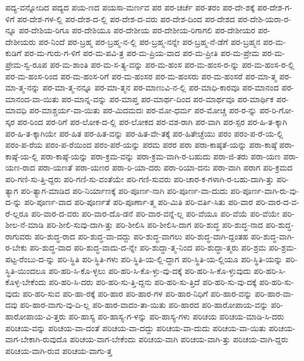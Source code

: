 {ಪದ್ಯ-ವನ್ನೋದಿದ
ಪದ್ಯದ
ಪಯ-ಣದ
ಪಯಸಾ-ಮರ್ಣವ
ಪರ
ಪರ-ಚರ್ಚೆ
ಪರ-ತರಂ
ಪರ-ದೇ-ಶಕ್ಕೆ
ಪರ-ದೇಶ-ಗ-ಳಿಗೆ
ಪರ-ದೇಶ-ಗಳ-ಲ್ಲಿ
ಪರ-ದೇಶ-ದ-ಲ್ಲಿ
ಪರ-ದೇಶ-ದ-ವರು
ಪರ-ದೇಶ-ದಿಂದ
ಪರ-ದೇಶದ
ಪರ-ದೇಶಿ-ಯರಾ-ರ-ನ್ನೂ
ಪರ-ದೇಶಿಯ-ರಿಗೂ
ಪರ-ದೇಶಿಯೂ
ಪರ-ದೇಶೀಯ
ಪರ-ದೇಶೀಯ-ರಿಗಾಗಲಿ
ಪರ-ದೇಶೀಯರ
ಪರ-ದೇಶೀಯರು
ಪರ-ನಿಂದೆ
ಪರ-ಬ್ರಹ್ಮ
ಪರ-ಬ್ರಹ್ಮ-ನ-ಲ್ಲಿ
ಪರ-ಬ್ರಹ್ಮ-ನನ್ನೇ
ಪರ-ಬ್ರಹ್ಮ-ನೆ-ಡೆಗೆ
ಪರ-ಬ್ರಹ್ಮನ
ಪರ-ಮ-ಕುಡಿಗೆ
ಪರ-ಮ-ಗುರು-ಗ-ಳಿಗೆ
ಪರ-ಮ-ಪವಿ-ತ್ರ
ಪರ-ಮ-ಪ್ರಿಯ-ವಾದ
ಪರ-ಮ-ಪ್ರೀತಿ
ಪರ-ಮ-ಪ್ರೇಮ
ಪರ-ಮ-ಪ್ರೇಮ-ಸ್ವ-ರೂಪ
ಪರ-ಮ-ಶಾಂತಿ
ಪರ-ಮ-ಸ-ತ್ಯ-ವನ್ನು
ಪರ-ಮ-ಹಂಸ
ಪರ-ಮ-ಹಂಸ-ರ-ನ್ನು
ಪರ-ಮ-ಹಂಸ-ರ-ಲ್ಲಿ
ಪರ-ಮ-ಹಂಸ-ರಿಂದ
ಪರ-ಮ-ಹಂಸ-ರಿಗೆ
ಪರ-ಮ-ಹಂಸರ
ಪರ-ಮ-ಹಂಸರು
ಪರ-ಮ-ಹಂಸರೆ
ಪರ-ಮಾ-ತ್ಮ
ಪರ-ಮಾ-ತ್ಮ-ನನ್ನು
ಪರ-ಮಾ-ತ್ಮ-ನನ್ನೂ
ಪರ-ಮಾ-ತ್ಮನ
ಪರ-ಮಾಣುವಿ-ನ-ಲ್ಲಿ
ಪರ-ಮಾಧಿ-ಕಾರವೂ
ಪರ-ಮಾನಂದ
ಪರ-ಮಾನಂದ-ವಾ-ಯಿತು
ಪರ-ಮಾನ್ನ-ವನ್ನು
ಪರ-ಮಾಪ್ತ
ಪರ-ಮಾರ್ಥ-ದಿಂದ
ಪರ-ಮಾರ್ಥವೂ
ಪರ-ಮಾರ್ಥಿಕ
ಪರ-ಮಾವಧಿ
ಪರ-ಮಾಶ್ಚರ್ಯ-ವಾ-ಯಿತು
ಪರ-ಮಿದಮದಃ
ಪರ-ಮೋ-ಧರ್ಮ
ಪರ-ಮೋಚ್ಚ
ಪರ-ರ-ನ್ನು
ಪರ-ರಿ-ಗೋ-ಸ್ಕರ
ಪರ-ರಿಂದ
ಪರ-ರಿಗೆ
ಪರ-ಲೋಕ-ದ-ಲ್ಲಿ
ಪರ-ಲೋಕದ
ಪರ-ವಶ-ರಾಗಿ
ಪರ-ವಾಗಿ
ಪರ-ಸ್ಪರ
ಪರ-ಹಿ-ತ-ಕ್ಕಾಗಿ
ಪರ-ಹಿ-ತ-ಕ್ಕಾಗಿಯೇ
ಪರ-ಹಿತ
ಪರ-ಹಿತ-ವನ್ನು
ಪರ-ಹಿತ-ವೇ-ತಕ್ಕೆ
ಪರ-ಹಿತೇಚ್ಛೆಯು
ಪರಂ
ಪರಂ-ಪ-ರೆ-ಯ-ಲ್ಲಿ
ಪರಂ-ಪ-ರೆಯ
ಪರಂ-ಪ-ರೆಯಿಂದ
ಪರಂ-ಪರೆ-ಯನ್ನು
ಪರಮ
ಪರರ
ಪರಾ
ಪರಾ-ಕಾಷ್ಠತೆ-ಯನ್ನು
ಪರಾ-ಕಾಷ್ಠೆ
ಪರಾ-ಕಾಷ್ಠೆ-ಯ-ಲ್ಲಿ
ಪರಾ-ಕಾಷ್ಠೆ-ಯನ್ನು
ಪರಾ-ಕ್ರಮ-ವನ್ನು
ಪರಾ-ಕ್ರಮ-ವಾಗಿ-ರ-ಬಹುದು
ಪರಾ-ಜಿ-ತರು
ಪರಾ-ಯಣ
ಪರಾ-ಯಣ-ರಾದ
ಪರಾ-ಯಣತೆ
ಪರಾ-ಯಣರ
ಪರಾ-ರಿ-ಯಾ-ದರು
ಪರಾ-ರಿಯಾ-ದನು
ಪರಾ-ವಾಗಿ
ಪರಾಗ
ಪರಿ-ಕ್ರಮದ
ಪರಿ-ಗಣಿ-ಸು-ತ್ತಿ-ದ್ದರು
ಪರಿ-ಗಣಿ-ಸು-ವಂತೆಯೇ
ಪರಿ-ಗಣಿ-ಸುವರು
ಪರಿ-ಚಾರ-ಕ-ಗಳಾಗಿ-ರ-ಬಹು-ದಾಗಿ-ತ್ತು
ಪರಿ-ತ್ಯಾಗ
ಪರಿ-ತ್ಯಾಗ-ಮಾಡಿದ
ಪರಿ-ನಿರ್ಯಾಣಕ್ಕೆ
ಪರಿ-ಪೂರ್ಣ-ನಾಗಿ
ಪರಿ-ಪೂರ್ಣ-ವಾ-ದುದು
ಪರಿ-ಪೂರ್ಣ-ವಾಗಿ-ರು-ವು-ದ-ನ್ನು
ಪರಿ-ಪೂರ್ಣ-ವಾದ
ಪರಿ-ಪೂರ್ಣತೆ
ಪರಿ-ಪೂರ್ಣಾ-ತ್ಮ
ಪರಿ-ಮಿತಿ
ಪರಿ-ವರ್ತಿ-ಸಿತು
ಪರಿ-ವಾರ
ಪರಿ-ವಾರ-ದ-ವ-ರೆ-ಲ್ಲರೂ
ಪರಿ-ವಾರ-ದ-ವರು
ಪರಿ-ವಾರ-ದೊ-ಡನೆ
ಪರಿ-ವಾರ-ವನ್ನೆ-ಲ್ಲ
ಪರಿ-ವೆಯೂ
ಪರಿ-ವೆಯೆ
ಪರಿ-ವೆಯೇ
ಪರಿ-ಶೀಲ-ನೆ-ಮಾಡಿ
ಪರಿ-ಶೀಲಿ-ಸುವು-ದಾಗಿ-ತ್ತು
ಪರಿ-ಶೀಲಿಸಿ
ಪರಿ-ಶೀಲಿಸಿ-ದಾಗ
ಪರಿ-ಶುದ್ಧ
ಪರಿ-ಶುದ್ಧ-ನಾದ
ಪರಿ-ಶುದ್ಧ-ರಾಗುವರು
ಪರಿ-ಶುದ್ಧ-ರಾದ
ಪರಿ-ಶುದ್ಧ-ವಾ-ದದ್ದು
ಪರಿ-ಶುದ್ಧ-ವಾಗಲು
ಪರಿ-ಶುದ್ಧ-ವಾಗಿ-ದ್ದಂತಹ
ಪರಿ-ಶುದ್ಧ-ವಾಗಿ-ರ-ಬೇಕು
ಪರಿ-ಶುದ್ಧ-ವಾದ
ಪರಿ-ಶುದ್ಧ-ವಾದು-ದ-ನ್ನೇ
ಪರಿ-ಶುದ್ಧಾ-ತ್ಮ-ನಿಂದ
ಪರಿ-ಶುದ್ಧಾ-ತ್ಮರು
ಪರಿ-ಶ್ರಮ
ಪರಿ-ಶ್ರಮ-ಪಟ್ಟ-ರೆಂಬು-ದ-ನ್ನು
ಪರಿ-ಸ್ಥಿತಿ
ಪರಿ-ಸ್ಥಿತಿ-ಗಳು
ಪರಿ-ಸ್ಥಿತಿ-ಯ-ಲ್ಲಿ-ದ್ದಾಗ
ಪರಿ-ಸ್ಥಿತಿ-ಯ-ಲ್ಲಿಯೂ
ಪರಿ-ಸ್ಥಿತಿ-ಯನ್ನು
ಪರಿ-ಸ್ಥಿತಿ-ಯಿಂದಲೂ
ಪರಿ-ಹರಿ-ಸಿ-ಕೊ-ಳ್ಳಲು
ಪರಿ-ಹರಿ-ಸಿ-ಕೊ-ಳ್ಳು-ವು-ದಕ್ಕೆ
ಪರಿ-ಹರಿ-ಸಿ-ಕೊ-ಳ್ಳುವುದು
ಪರಿ-ಹರಿ-ಸಿ-ಕೊಳ್ಳ-ಬೇಕೆಂದು
ಪರಿ-ಹರಿ-ಸಿ-ದರು
ಪರಿ-ಹರಿ-ಸು-ತ್ತಿ-ದ್ದನು
ಪರಿ-ಹರಿ-ಸು-ತ್ತಿದೆ
ಪರಿ-ಹರಿ-ಸು-ವು-ದಕ್ಕೆ
ಪರಿ-ಹರಿ-ಸು-ವುದು
ಪರಿ-ಹರಿ-ಸುವ
ಪರಿ-ಹಾ-ರಕ್ಕೆ
ಪರಿ-ಹಾರ
ಪರಿ-ಹಾರ-ಗಳ
ಪರಿ-ಹಾರ-ನಿಧಿಗೆ
ಪರಿ-ಹಾರ-ವನ್ನು
ಪರಿ-ಹಾರ-ವಾ-ದವು
ಪರಿ-ಹಾರ-ವಾಗು-ವು-ದಿ-ಲ್ಲ
ಪರಿ-ಹಾರ-ವಾದಂ-ತಾ-ಯಿತು
ಪರಿ-ಹಾರದ
ಪರಿ-ಹಾರೋಪಾಯ-ವನ್ನು
ಪರಿ-ಹಾರೋಪಾಯ-ವಿ-ತ್ತರು
ಪರಿ-ಹಾಸ್ಯ
ಪರಿ-ಹಾಸ್ಯ-ಗ-ಳನ್ನು
ಪರಿ-ಹಾಸ್ಯ-ಗಳು
ಪರಿಚಯ
ಪರಿಚಯ-ಮಾಡಿ-ಸಿ-ದರು
ಪರಿಚಯ-ವನ್ನು
ಪರಿಚಯ-ವಾ-ದಂತೆ
ಪರಿಚಯ-ವಾ-ದದ್ದು
ಪರಿಚಯ-ವಾ-ದುದು
ಪರಿಚಯ-ವಾ-ಯಿತು
ಪರಿಚಯ-ವಾಗ-ಬೇಕಾಗಿ-ರುವುದೊ
ಪರಿಚಯ-ವಾಗ-ಬೇಕೆಂದು
ಪರಿಚಯ-ವಾಗಿ
ಪರಿಚಯ-ವಾಗಿ-ತ್ತು
ಪರಿಚಯ-ವಾಗಿ-ದ್ದರು
ಪರಿಚಯ-ವಾಗಿ-ರುವ
ಪರಿಚಯ-ವಾಗು-ತ್ತ
}
